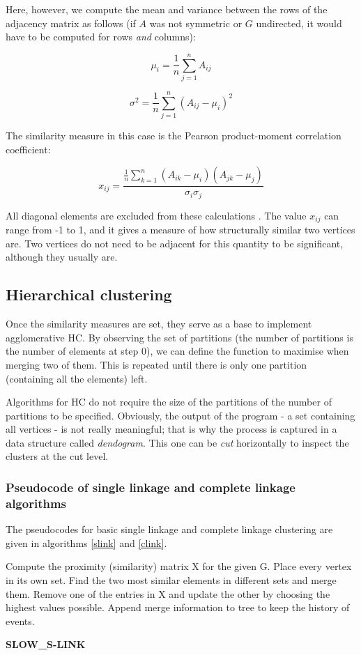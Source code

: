 \documentclass[12pt,a4paper]{article}
\begin{document}
Here, however, we compute the mean and variance between the rows of
the adjacency matrix as follows (if $A$ was not symmetric or $G$
undirected, it would have to be computed for rows \emph{and} columns):

$$ \mu_i = \frac{1}{n} \sum_{j=1}^{n} A_{ij} $$

$$ \sigma^2 = \frac{1}{n} \sum_{j=1}^{n} (A_{ij} - \mu_i)^2 $$

The similarity measure in this case is the Pearson product-moment
correlation coefficient:

$$ x_{ij} = \frac{\frac{1}{n}\sum_{k=1}^{n}(A_{ik} -
  \mu_i)(A_{jk}-\mu_j)}{\sigma_i\sigma_j} $$

All diagonal elements are excluded from these calculations
\cite[p.~369]{socionetwork}. The value $x_{ij}$ can range from -1 to
1, and it gives a measure of how structurally similar two vertices
are. Two vertices do not need to be adjacent for this quantity to be
significant, although they usually are.

\subsection{Hierarchical clustering}

Once the similarity measures are set, they serve as a base to
implement agglomerative HC. By observing the set of partitions (the
number of partitions is the number of elements at step 0), we can
define the function to maximise when merging two of them. This is
repeated until there is only one partition (containing all the
elements) left.

Algorithms for HC do not require the size of the partitions of the
number of partitions to be specified. Obviously, the output of the
program - a set containing all vertices - is not really meaningful;
that is why the process is captured in a data structure called
\emph{dendogram}. This one can be \emph{cut} horizontally to inspect
the clusters at the cut level.

\subsubsection{Pseudocode of single linkage and complete linkage
  algorithms}

The pseudocodes for basic single linkage and complete linkage
clustering are given in algorithms \ref{slink} and \ref{clink}.

\begin{algorithm}[h]
  \SetAlgoLined

  \nl Compute the proximity (similarity) matrix X for the given G.\;
  \nl Place every vertex in its own set.\;
  \nl Find the two most similar elements in different sets and merge them.\;
  \nl Remove one of the entries in X and update the other by choosing the highest
  values possible.\;
  \nl Append merge information to tree to keep the history of events.\;
  \nl {}
  \caption{\bf SLOW\_S-LINK}
  \label{slink}
\end{algorithm}
\end{document}
